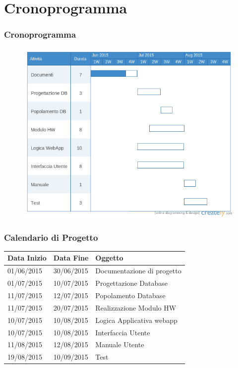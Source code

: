 \documentclass[a4paper,12pt]{beamer}
\begin{document}
\section{Cronoprogramma}
\begin{frame}
\frametitle{Cronoprogramma}
\begin{figure}[htbp]
\centering
\includegraphics[trim={0 0.66cm 0 0}, clip, scale=0.4]{../ProjectPlan/gantt.png}
\end{figure}
\end{frame}

\begin{frame}
\frametitle{Calendario di Progetto}
\begin{table}[ht]
\begin{center}
\begin{tabular}{l | l | l}
\rowcolor{Ash}
\hline
Data Inizio        & Data Fine	      &  	Oggetto	     \\ \hline
01/06/2015 & 30/06/2015 & Documentazione di progetto  \\ \hline
01/07/2015 & 10/07/2015 & Progettazione Database	     \\ \hline
11/07/2015 & 12/07/2015 & Popolamento Database	     \\ \hline
11/07/2015 & 20/07/2015 & Realizzazione Modulo HW    \\ \hline
10/07/2015 & 10/08/2015 & Logica Applicativa webapp    \\ \hline
10/07/2015 & 10/08/2015 & Interfaccia Utente			     \\ \hline
11/08/2015 & 12/08/2015 & Manuale Utente			     \\ \hline
19/08/2015 & 10/09/2015 & Test						     \\ \hline
\end{tabular}
\end{center}
\end{table}
\end{frame}
\end{document}
